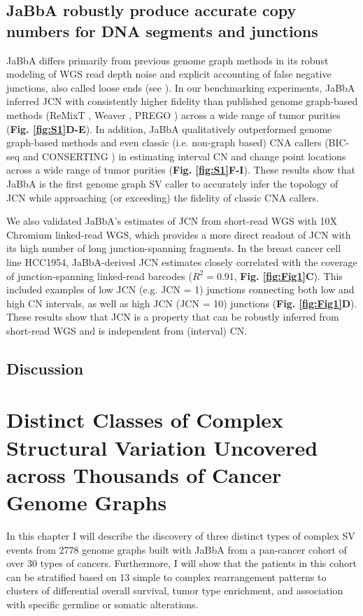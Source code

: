 \documentclass[phd,tocprelim]{cornell}
\begin{document}
\section{JaBbA robustly produce accurate copy numbers for DNA segments and junctions}
JaBbA differs primarily from previous genome graph methods in its robust modeling of WGS read depth noise and explicit accounting of false negative junctions, also called loose ends (see ). In our benchmarking experiments, JaBbA inferred JCN with consistently higher fidelity than published genome graph-based methods (ReMixT \cite{McPherson2017-ry}, Weaver \cite{Li2016-qa}, PREGO \cite{Oesper2012-vw}) across a wide range of tumor purities (\textbf{Fig. \ref{fig:S1}D-E}). In addition, JaBbA qualitatively outperformed genome graph-based methods and even classic (i.e. non-graph based) CNA callers (BIC-seq \cite{Xi2011-oa} and CONSERTING \cite{Chen2015-sw}) in estimating interval CN and change point locations across a wide range of tumor purities (\textbf{Fig. \ref{fig:S1}F-I}). These results show that JaBbA is the first genome graph SV caller to accurately infer the topology of JCN while approaching (or exceeding) the fidelity of classic CNA callers. 

We also validated JaBbA's estimates of JCN from short-read WGS with 10X Chromium linked-read WGS, which provides a more direct readout of JCN with its high number of long junction-spanning fragments. In the breast cancer cell line HCC1954, JaBbA-derived JCN estimates closely correlated with the coverage of junction-spanning linked-read barcodes ($R^2 = 0.91$, \textbf{Fig. \ref{fig:Fig1}C}). This included examples of low JCN (e.g. JCN = 1) junctions connecting both low and high CN intervals, as well as high JCN (JCN = 10)  junctions (\textbf{Fig. \ref{fig:Fig1}D}). These results show that JCN is a property that can be robustly inferred from short-read WGS and is independent from (interval) CN. 

\section{Discussion}

\chapter{Distinct Classes of Complex Structural Variation Uncovered across Thousands of Cancer Genome Graphs}
In this chapter I will describe the discovery of three distinct types of complex SV events from 2778 genome graphs built with JaBbA from a pan-cancer cohort of over 30 types of cancers. Furthermore, I will show that the patients in this cohort can be stratified based on 13 simple to complex rearrangement patterns to clusters of differential overall survival, tumor type enrichment, and association with specific germline or somatic alterations.
\end{document}
